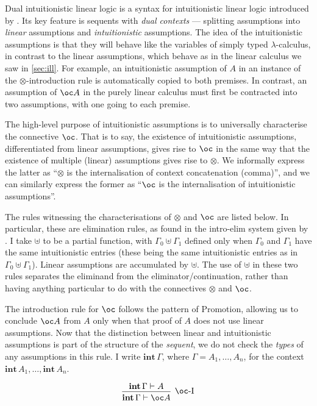 Dual intuitionistic linear logic is a syntax for intuitionistic linear logic
introduced by \citet{Barber1996}.
Its key feature is sequents with \emph{dual contexts} --- splitting assumptions
into \emph{linear} assumptions and \emph{intuitionistic} assumptions.
The idea of the intuitionistic assumptions is that they will behave like the
variables of simply typed $\lambda$-calculus, in contrast to the linear
assumptions, which behave as in the linear calculus we saw in \autoref{sec:ill}.
For example, an intuitionistic assumption of $A$ in an instance of the
$\otimes$-introduction rule is automatically copied to both premises.
In contrast, an assumption of $\oc A$ in the purely linear calculus must first
be contracted into two assumptions, with one going to each premise.

The high-level purpose of intuitionistic assumptions is to universally
characterise the connective $\oc$.
That is to say, the existence of intuitionistic assumptions, differentiated from
linear assumptions, gives rise to $\oc$ in the same way that the existence of
multiple (linear) assumptions gives rise to $\otimes$.
We informally express the latter as ``$\otimes$ is the internalisation of
context concatenation (comma)'', and we can similarly express the former as
``$\oc$ is the internalisation of intuitionistic assumptions''.

The rules witnessing the characterisations of $\otimes$ and $\oc$ are listed
below.
In particular, these are elimination rules, as found in the intro-elim system
given by \citeauthor{Barber1996}.
I take $\uplus$ to be a partial function, with $\Gamma_0 \uplus \Gamma_1$
defined only when $\Gamma_0$ and $\Gamma_1$ have the same intuitionistic
entries (these being the same intuitionistic entries as in
$\Gamma_0 \uplus \Gamma_1$).
Linear assumptions are accumulated by $\uplus$.
The use of $\uplus$ in these two rules separates the eliminand from the
eliminator/continuation, rather than having anything particular to do with
the connectives $\otimes$ and $\oc$.


The introduction rule for $\oc$ follows the pattern of Promotion, allowing us
to conclude $\oc A$ from $A$ only when that proof of $A$ does not use linear
assumptions.
Now that the distinction between linear and intuitionistic assumptions is part
of the structure of the \emph{sequent}, we do not check the \emph{types} of any
assumptions in this rule.
I write $\mathbf{int}\,\Gamma$, where $\Gamma = A_1, \ldots, A_n$, for the
context $\mathbf{int}\,A_1, \ldots, \mathbf{int}\,A_n$.

\[
  \begin{prooftree}
    \hypo{\mathbf{int}\,\Gamma \vdash A}
    \infer1[$\oc$-I]{\mathbf{int}\,\Gamma \vdash \oc A}
  \end{prooftree}
\]

